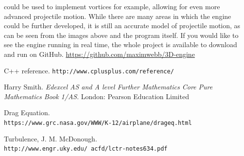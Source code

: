 \documentclass{article}
\begin{document}
\cite{turb}
could be used to implement vortices for example, allowing for even more advanced projectile motion.
\newline
\newline
While there are many areas in which the engine could be further developed, it is still an accurate model of projectile motion, as can be seen from the images above and the program itself. If you would like to see the engine running in real time, the whole project is available to download and run on GitHub. \href{https://github.com/maximwebb/3D-engine}{\color{blue} https://github.com/maximwebb/3D-engine}\color{black}

\newpage
\begin{thebibliography}{4}
C++ reference.
\texttt{http://www.cplusplus.com/reference/}

Harry Smith.
\textit{Edexcel AS and A level Further Mathematics Core Pure Mathematics Book 1/AS}.
London: Pearson Education Limited

Drag Equation.
\\\texttt{https://www.grc.nasa.gov/WWW/K-12/airplane/drageq.html}

Turbulence, J. M. McDonough.
\\\texttt{http://www.engr.uky.edu/~acfd/lctr-notes634.pdf}

\end{thebibliography}
\end{document}
